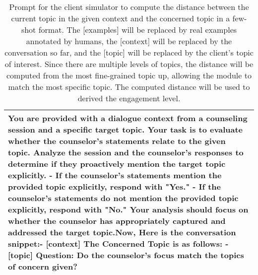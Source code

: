 \begin{table*}[tb]
\begin{tabularx}{\textwidth}{X}
\toprule
{\sf \footnotesize You are provided with a dialogue context from a counseling session and a specific target topic. Your task is to evaluate whether the counselor's statements relate to the given topic. Analyze the session and the counselor's responses to determine if they proactively mention the target topic explicitly.
- If the counselor’s statements mention the provided topic explicitly, respond with "Yes." \newline - If the counselor’s statements do not mention the provided topic explicitly, respond with "No." \newline \newline Your analysis should focus on whether the counselor has appropriately captured and addressed the target topic.\newline [examples]\newline \newline \newline Now, Here is the conversation snippet:\newline - [context] \newline \newline The Concerned Topic is as follows: \newline - [topic] \newline \newline Question: Do the counselor’s focus match the topics of concern given?}
\\ \bottomrule
\end{tabularx}
\caption{Prompt for the client simulator to compute the distance between the current topic in the given context and the concerned topic in a few-shot format. The [examples] will be replaced by real examples annotated by humans, the [context] will be replaced by the conversation so far, and the [topic] will be replaced by the client's topic of interest. Since there are multiple levels of topics, the distance will be computed from the most fine-grained topic up, allowing the module to match the most specific topic. The computed distance will be used to derived the engagement level.}
\label{tab:dynamic engagement}
\end{table*}

